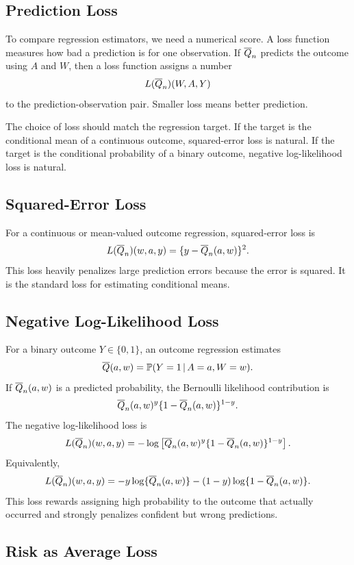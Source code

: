 \label{lec:5-3}

\subsection{Prediction Loss}

To compare regression estimators, we need a numerical score. A loss function measures
how bad a prediction is for one observation. If $\overline{Q}_n$ predicts the outcome using
$A$ and $W$, then a loss function assigns a number
\[
L(\overline{Q}_n)(W,A,Y)
\]
to the prediction-observation pair. Smaller loss means better prediction.

The choice of loss should match the regression target. If the target is the conditional
mean of a continuous outcome, squared-error loss is natural. If the target is the
conditional probability of a binary outcome, negative log-likelihood loss is natural.

\subsection{Squared-Error Loss}

For a continuous or mean-valued outcome regression, squared-error loss is
\[
L(\overline{Q}_n)(w,a,y)
=
\{y-\overline{Q}_n(a,w)\}^2.
\]
This loss heavily penalizes large prediction errors because the error is squared. It is
the standard loss for estimating conditional means.

\subsection{Negative Log-Likelihood Loss}

For a binary outcome $Y\in\{0,1\}$, an outcome regression estimates
\[
\overline{Q}(a,w)=\mathbb{P}(Y=1\,\vert\, A=a,W=w).
\]
If $\overline{Q}_n(a,w)$ is a predicted probability, the Bernoulli likelihood contribution is
\[
\overline{Q}_n(a,w)^y\{1-\overline{Q}_n(a,w)\}^{1-y}.
\]
The negative log-likelihood loss is
\[
L(\overline{Q}_n)(w,a,y)
=
-\log\left[
\overline{Q}_n(a,w)^y\{1-\overline{Q}_n(a,w)\}^{1-y}
\right].
\]
Equivalently,
\[
L(\overline{Q}_n)(w,a,y)
=
-y\log\{\overline{Q}_n(a,w)\}
-(1-y)\log\{1-\overline{Q}_n(a,w)\}.
\]
This loss rewards assigning high probability to the outcome that actually occurred
and strongly penalizes confident but wrong predictions.

\subsection{Risk as Average Loss}

